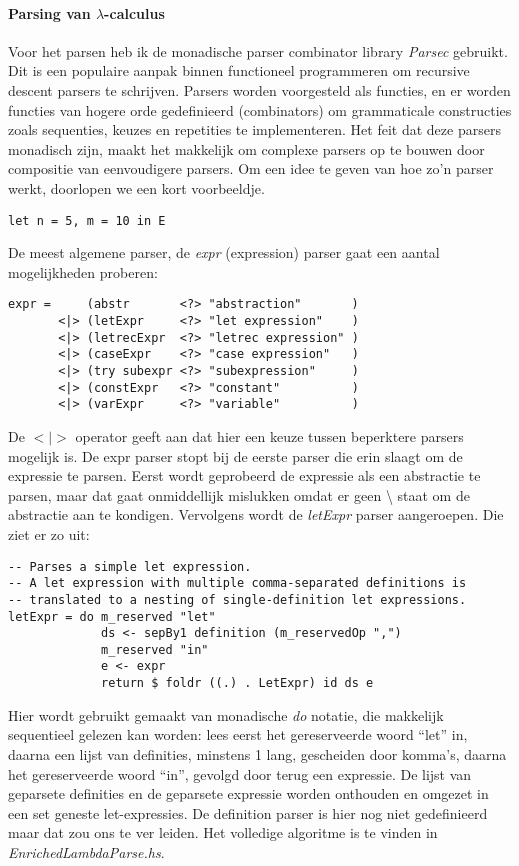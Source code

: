 \documentclass[a4paper,10pt]{article}
\begin{document}
\paragraph{Parsing van $\lambda$-calculus}
Voor het parsen heb ik de monadische parser combinator library \emph{Parsec} gebruikt.
Dit is een populaire aanpak binnen functioneel programmeren om recursive descent parsers te schrijven.
Parsers worden voorgesteld als functies, en er worden functies van hogere orde gedefinieerd (combinators) om grammaticale constructies zoals sequenties, keuzes en repetities te implementeren.
Het feit dat deze parsers monadisch zijn, maakt het makkelijk om complexe parsers op te bouwen door compositie van eenvoudigere parsers.
Om een idee te geven van hoe zo'n parser werkt, doorlopen we een kort voorbeeldje.
\begin{verbatim}
let n = 5, m = 10 in E
\end{verbatim}
De meest algemene parser, de \emph{expr} (expression) parser gaat een aantal mogelijkheden proberen:
\begin{lstlisting}
expr =     (abstr       <?> "abstraction"       )
       <|> (letExpr     <?> "let expression"    )
       <|> (letrecExpr  <?> "letrec expression" )
       <|> (caseExpr    <?> "case expression"   )
       <|> (try subexpr <?> "subexpression"     )
       <|> (constExpr   <?> "constant"          )
       <|> (varExpr     <?> "variable"          )
\end{lstlisting}
De $<|>$ operator geeft aan dat hier een keuze tussen beperktere parsers mogelijk is.
De expr parser stopt bij de eerste parser die erin slaagt om de expressie te parsen.
Eerst wordt geprobeerd de expressie als een abstractie te parsen, maar dat gaat onmiddellijk mislukken omdat er geen \textbackslash{} staat om de abstractie aan te kondigen.
Vervolgens wordt de \emph{letExpr} parser aangeroepen. Die ziet er zo uit:
\begin{lstlisting}
-- Parses a simple let expression.
-- A let expression with multiple comma-separated definitions is 
-- translated to a nesting of single-definition let expressions.
letExpr = do m_reserved "let"
             ds <- sepBy1 definition (m_reservedOp ",")
             m_reserved "in"
             e <- expr
             return $ foldr ((.) . LetExpr) id ds e
\end{lstlisting}
Hier wordt gebruikt gemaakt van monadische \emph{do} notatie, die makkelijk sequentieel gelezen kan worden: lees eerst het gereserveerde woord ``let'' in, daarna een lijst van definities, minstens 1 lang, gescheiden door komma's, daarna het gereserveerde woord ``in'', gevolgd door terug een expressie.
De lijst van geparsete definities en de geparsete expressie worden onthouden en omgezet in een set geneste let-expressies.
De definition parser is hier nog niet gedefinieerd maar dat zou ons te ver leiden.
Het volledige algoritme is te vinden in \emph{EnrichedLambdaParse.hs}.
\end{document}
